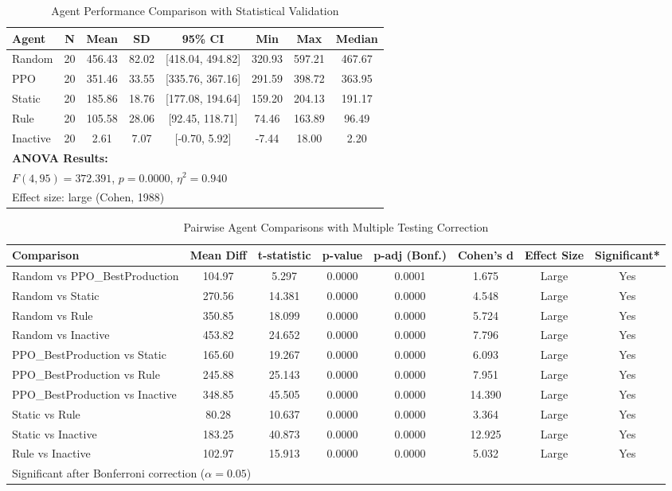 \begin{table}[H]
\centering
\caption{Agent Performance Comparison with Statistical Validation}
\label{tab:agent_performance}
\begin{tabular}{lccccccc}
\toprule
Agent & N & Mean & SD & 95\% CI & Min & Max & Median \\
\midrule
Random & 20 & 456.43 & 82.02 & [418.04, 494.82] & 320.93 & 597.21 & 467.67 \\
PPO & 20 & 351.46 & 33.55 & [335.76, 367.16] & 291.59 & 398.72 & 363.95 \\
Static & 20 & 185.86 & 18.76 & [177.08, 194.64] & 159.20 & 204.13 & 191.17 \\
Rule & 20 & 105.58 & 28.06 & [92.45, 118.71] & 74.46 & 163.89 & 96.49 \\
Inactive & 20 & 2.61 & 7.07 & [-0.70, 5.92] & -7.44 & 18.00 & 2.20 \\
\midrule
\multicolumn{8}{l}{\textbf{ANOVA Results:}} \\
\multicolumn{8}{l}{$F(4, 95) = 372.391$, $p = 0.0000$, $\eta^2 = 0.940$} \\
\multicolumn{8}{l}{Effect size: large (Cohen, 1988)} \\
\bottomrule
\end{tabular}
\end{table}

\begin{table}[H]
\centering
\caption{Pairwise Agent Comparisons with Multiple Testing Correction}
\label{tab:pairwise_comparisons}
\begin{tabular}{lccccccc}
\toprule
Comparison & Mean Diff & t-statistic & p-value & p-adj (Bonf.) & Cohen's d & Effect Size & Significant* \\
\midrule
Random vs PPO_BestProduction & 104.97 & 5.297 & 0.0000 & 0.0001 & 1.675 & Large & Yes \\
Random vs Static & 270.56 & 14.381 & 0.0000 & 0.0000 & 4.548 & Large & Yes \\
Random vs Rule & 350.85 & 18.099 & 0.0000 & 0.0000 & 5.724 & Large & Yes \\
Random vs Inactive & 453.82 & 24.652 & 0.0000 & 0.0000 & 7.796 & Large & Yes \\
PPO_BestProduction vs Static & 165.60 & 19.267 & 0.0000 & 0.0000 & 6.093 & Large & Yes \\
PPO_BestProduction vs Rule & 245.88 & 25.143 & 0.0000 & 0.0000 & 7.951 & Large & Yes \\
PPO_BestProduction vs Inactive & 348.85 & 45.505 & 0.0000 & 0.0000 & 14.390 & Large & Yes \\
Static vs Rule & 80.28 & 10.637 & 0.0000 & 0.0000 & 3.364 & Large & Yes \\
Static vs Inactive & 183.25 & 40.873 & 0.0000 & 0.0000 & 12.925 & Large & Yes \\
Rule vs Inactive & 102.97 & 15.913 & 0.0000 & 0.0000 & 5.032 & Large & Yes \\
\bottomrule
\multicolumn{8}{l}{\footnotesize *Significant after Bonferroni correction ($\alpha = 0.05$)} \\
\end{tabular}
\end{table}